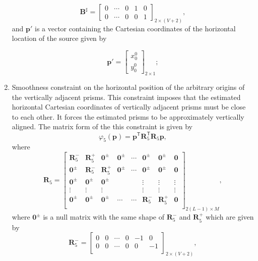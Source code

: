 \documentclass[extra,mreferee]{gji}
\begin{document}
\begin{enumerate}
\begin{equation}
\textbf{B}^{\sharp} = 
\begin{bmatrix}
0 & \cdots & 0 & 1 & 0 \\
0 & \cdots & 0 & 0 & 1
\end{bmatrix}_{2\times (V+2)},
\end{equation}
and $\textbf{p}'$ is a vector containing the Cartesian coordinates of the horizontal location of the source given by

\begin{equation}
\textbf{p}' = 
\begin{bmatrix}
x^0_0 \\
y^0_0
\end{bmatrix}_{2\times 1} ;
\end{equation}

\item Smoothness constraint on the horizontal position of the arbitrary origins of the vertically adjacent prisms. This constraint imposes that the estimated horizontal Cartesian coordinates of vertically adjacent prisms must be close to each other. It forces the estimated prisms to be approximately vertically aligned. The matrix form of the this constraint is given by
\begin{equation}
\varphi_{5}(\textbf{p}) = \textbf{p}^\mathsf{T}\textbf{R}^\mathsf{T}_{5}\textbf{R}_{5}\textbf{p} ,
\end{equation}
where
\begin{equation}
\mathbf{R}_{5} = 
\begin{bmatrix}
\mathbf{R}^{-}_{5} & \mathbf{R}^{+}_{5} & \mathbf{0}^{\pm} & \mathbf{0}^{\pm} & \cdots & \mathbf{0}^{\pm} & \mathbf{0}^{\pm} & \mathbf{0}\\
\mathbf{0}^{\pm} & \mathbf{R}^{-}_{5} & \mathbf{R}^{+}_{5} & \mathbf{0}^{\pm} & \cdots & \mathbf{0}^{\pm} & \mathbf{0}^{\pm} & \mathbf{0}\\
\mathbf{0}^{\pm} & \mathbf{0}^{\pm} & \mathbf{0}^{\pm} &  &  & \vdots & \vdots & \vdots\\
\vdots & \vdots & \vdots &  &  & \vdots & \vdots & \vdots\\
\mathbf{0}^{\pm} & \mathbf{0}^{\pm} & \mathbf{0}^{\pm} & \cdots & \cdots & \mathbf{R}^{-}_{5} & \mathbf{R}^{+}_{5} & \mathbf{0}\\
\end{bmatrix}_{2(L-1)\times M},
\end{equation}
where $\mathbf{0}^{\pm}$ is a null matrix with the same shape of $\mathbf{R}^{-}_{5}$ and $\mathbf{R}^{+}_{5}$ which are given by
\begin{equation}
\textbf{R}^{-}_{5} = 
\begin{bmatrix}
0 & 0 & \cdots & 0 & -1 & 0 \\
0 & 0 & \cdots & 0 & 0 & -1 \\
\end{bmatrix}_{2\times (V+2)},
\end{equation}


\end{enumerate}
\end{document}
